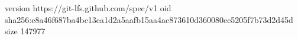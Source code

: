 version https://git-lfs.github.com/spec/v1
oid sha256:e8a46f687ba4bc13ea1d2a5aafb15aa4ac873610d360080ee5205f7b73d2d45d
size 147977
